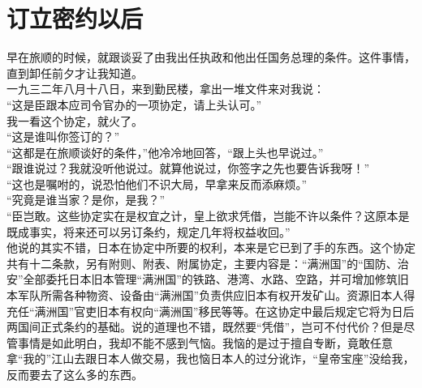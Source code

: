 \fancyhead[RO]{} %
\fancyhead[LE]{} %
\chapter*{订立密约以后}
\thispagestyle{empty}
早在旅顺的时候，就跟谈妥了由我出任执政和他出任国务总理的条件。这件事情，直到卸任前夕才让我知道。\\

一九三二年八月十八日，来到勤民楼，拿出一堆文件来对我说：\\

“这是臣跟本应司令官办的一项协定，请上头认可。”\\

我一看这个协定，就火了。\\

“这是谁叫你签订的？”\\

“这都是在旅顺谈好的条件，”他冷冷地回答，“跟上头也早说过。”\\

“跟谁说过？我就没听他说过。就算他说过，你签字之先也要告诉我呀！”\\

“这也是嘱咐的，说恐怕他们不识大局，早拿来反而添麻烦。”\\

“究竟是谁当家？是你，是我？”\\

“臣岂敢。这些协定实在是权宜之计，皇上欲求凭借，岂能不许以条件？这原本是既成事实，将来还可以另订条约，规定几年将权益收回。”\\

他说的其实不错，日本在协定中所要的权利，本来是它已到了手的东西。这个协定共有十二条款，另有附则、附表、附属协定，主要内容是：“满洲国”的“国防、治安”全部委托日本旧本管理“满洲国”的铁路、港湾、水路、空路，并可增加修筑旧本军队所需各种物资、设备由“满洲国”负责供应旧本有权开发矿山。资源旧本人得充任“满洲国”官吏旧本有权向“满洲国”移民等等。在这协定中最后规定它将为日后两国间正式条约的基础。说的道理也不错，既然要“凭借”，岂可不付代价？但是尽管事情是如此明白，我却不能不感到气恼。我恼的是过于擅自专断，竟敢任意拿“我的”江山去跟日本人做交易，我也恼日本人的过分讹诈，“皇帝宝座”没给我，反而要去了这么多的东西。\\

